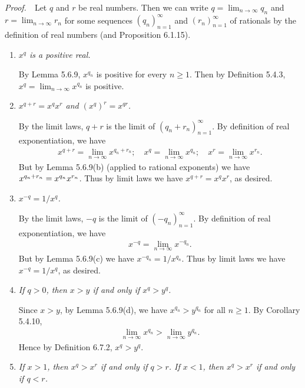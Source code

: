 \documentclass{book}
\newcommand{\pff}{\vspace{.25em}\noindent\emph{Proof.}~~}
\begin{document}
\pff Let $q$ and $r$ be real numbers. Then we can write $q=\lim_{n\to\infty}q_n$ and $r=\lim_{n\to\infty}r_n$ for some sequences $(q_n)_{n=1}^{\infty}$ and $(r_n)_{n=1}^{\infty}$ of rationals by the definition of real numbers (and Proposition 6.1.15).
\begin{enumerate}
    \item \emph{$x^q$ is a positive real.}

    By Lemma 5.6.9, $x^{q_n}$ is positive for every $n\geq 1$. Then by Definition 5.4.3, $x^q=\lim_{n\to\infty}x^{q_n}$ is positive.

    \item \emph{$x^{q+r}=x^qx^r$ and $(x^q)^r=x^{qr}$.}
    
    By the limit laws, $q+r$ is the limit of $(q_n+r_n)_{n=1}^{\infty}$. By definition of real exponentiation, we have
        \begin{align*}
            x^{q+r}=\lim_{n\to\infty}x^{q_n+r_n};\quad
            x^{q}=\lim_{n\to\infty}x^{q_n};\quad
            x^{r}=\lim_{n\to\infty}x^{r_n}.
        \end{align*}
    But by Lemma 5.6.9(b) (applied to rational exponents) we have $x^{q_n+r_n}\\=x^{q_n}x^{r_n}$. Thus by limit laws we have $x^{q+r}=x^qx^r$, as desired.

    \item \emph{$x^{-q}=1/x^q$.}

    By the limit laws, $-q$ is the limit of $(-q_n)_{n=1}^{\infty}$. By definition of real exponentiation, we have
        \begin{align*}
            x^{-q}=\lim_{n\to\infty}x^{-q_n}.
        \end{align*}
    But by Lemma 5.6.9(c) we have $x^{-q_n}=1/x^{q_n}$. Thus by limit laws we have $x^{-q}=1/x^q$, as desired.

    \item \emph{If $q>0$, then $x>y$ if and only if $x^q>y^q$.}
    
    Since $x>y$, by Lemma 5.6.9(d), we have $x^{q_n}>y^{q_n}$ for all $n\geq 1$. By Corollary 5.4.10,
        \begin{align*}
            \lim_{n\to\infty}x^{q_n}>\lim_{n\to\infty}y^{q_n}.
        \end{align*}
    Hence by Definition 6.7.2, $x^q>y^q$.

    \item \emph{If $x>1$, then $x^q>x^r$ if and only if $q>r$. If $x<1$, then $x^q>x^r$ if and only if $q<r$.}
    

\end{enumerate}
\end{document}
